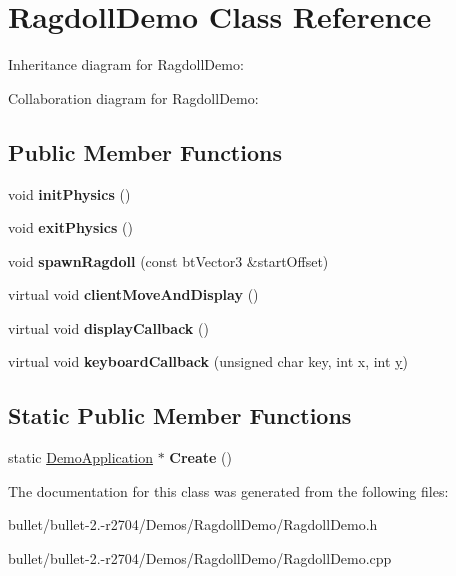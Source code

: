 \hypertarget{class_ragdoll_demo}{\section{Ragdoll\+Demo Class Reference}
\label{class_ragdoll_demo}
}


Inheritance diagram for Ragdoll\+Demo\+:


Collaboration diagram for Ragdoll\+Demo\+:
\subsection*{Public Member Functions}
\begin{DoxyCompactItemize}
\item 
\hypertarget{class_ragdoll_demo_aae4f0832966492b5da9a608f5d3b8e95}{void {\bfseries init\+Physics} ()}\label{class_ragdoll_demo_aae4f0832966492b5da9a608f5d3b8e95}

\item 
\hypertarget{class_ragdoll_demo_ac06f3be9fffd6c22d2064038dae38d0d}{void {\bfseries exit\+Physics} ()}\label{class_ragdoll_demo_ac06f3be9fffd6c22d2064038dae38d0d}

\item 
\hypertarget{class_ragdoll_demo_aa0626b9553ffc08c418ab94ce27377da}{void {\bfseries spawn\+Ragdoll} (const bt\+Vector3 \&start\+Offset)}\label{class_ragdoll_demo_aa0626b9553ffc08c418ab94ce27377da}

\item 
\hypertarget{class_ragdoll_demo_ac7ebb4d1da093133e572eca4280cb1bb}{virtual void {\bfseries client\+Move\+And\+Display} ()}\label{class_ragdoll_demo_ac7ebb4d1da093133e572eca4280cb1bb}

\item 
\hypertarget{class_ragdoll_demo_ab1ca15d961ecfdf4c8983d79570825a5}{virtual void {\bfseries display\+Callback} ()}\label{class_ragdoll_demo_ab1ca15d961ecfdf4c8983d79570825a5}

\item 
\hypertarget{class_ragdoll_demo_a69e6e248331c423fcc69a03b818f71b4}{virtual void {\bfseries keyboard\+Callback} (unsigned char key, int x, int \hyperlink{_ice_utils_8h_aa7ffaed69623192258fb8679569ff9ba}{y})}\label{class_ragdoll_demo_a69e6e248331c423fcc69a03b818f71b4}

\end{DoxyCompactItemize}
\subsection*{Static Public Member Functions}
\begin{DoxyCompactItemize}
\item 
\hypertarget{class_ragdoll_demo_a1d13fa490972203de1e63de3be00afe0}{static \hyperlink{class_demo_application}{Demo\+Application} $\ast$ {\bfseries Create} ()}\label{class_ragdoll_demo_a1d13fa490972203de1e63de3be00afe0}

\end{DoxyCompactItemize}


The documentation for this class was generated from the following files\+:\begin{DoxyCompactItemize}
\item 
bullet/bullet-\/2.-\/r2704/\+Demos/\+Ragdoll\+Demo/Ragdoll\+Demo.\+h\item 
bullet/bullet-\/2.-\/r2704/\+Demos/\+Ragdoll\+Demo/Ragdoll\+Demo.\+cpp\end{DoxyCompactItemize}
